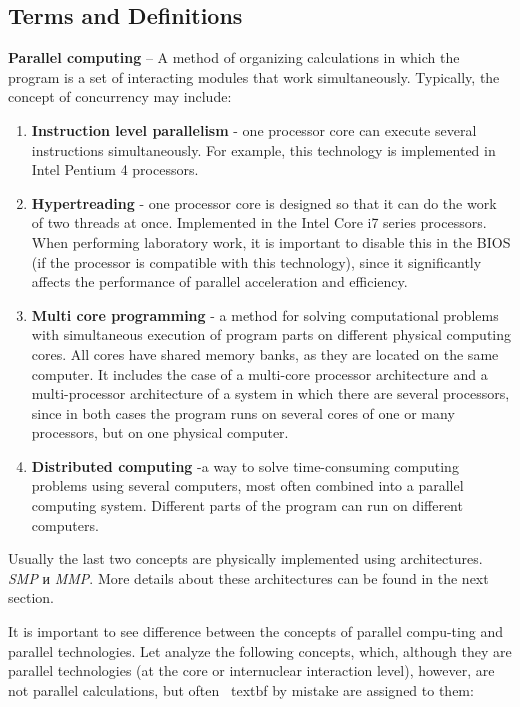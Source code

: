 { %
	\subsection{Terms and Definitions}
	\par\textbf{Parallel computing} – 
A method of organizing calculations in which the program is a set of interacting modules that work simultaneously. Typically, the concept of concurrency may include:
		\begin{enumerate}
			\item\textbf{Instruction level parallelism} - one processor core can execute several instructions simultaneously. For example, this technology is implemented in Intel Pentium 4 processors.
			\item\textbf{Hypertreading} - one processor core is designed so that it can do the work of two threads at once. Implemented in the Intel Core i7 series processors. When performing laboratory work, it is important to disable this in the BIOS (if the processor is compatible with this technology), since it significantly affects the performance of parallel acceleration and efficiency.
			\item\textbf{Multi core programming} -  a method for solving computational problems with simultaneous execution of program parts on different physical computing cores. All cores have shared memory banks, as they are located on the same computer. It includes the case of a multi-core processor architecture and a multi-processor architecture of a system in which there are several processors, since in both cases the program runs on several cores of one or many processors, but on one physical computer.
			\item\textbf{Distributed computing} -a way to solve time-consuming computing problems using several computers, most often combined into a parallel computing system. Different parts of the program can run on different computers.
		\end{enumerate}
Usually the last two concepts are physically implemented using architectures. \textit{SMP} и \textit{MMP}. More details about these architectures can be found in the next section.
	\par It is important to see difference between the concepts of parallel compu-ting and parallel technologies. Let  analyze the following concepts, which, although they are parallel technologies (at the core or internuclear interaction level), however, are not parallel calculations, but often \ textbf {by mistake} are assigned to them:
}
